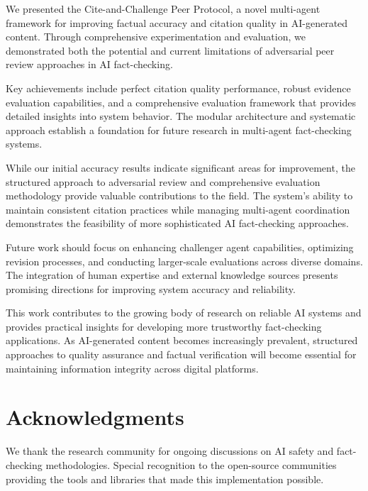 \documentclass{article}
\begin{document}
We presented the Cite-and-Challenge Peer Protocol, a novel multi-agent framework for improving factual accuracy and citation quality in AI-generated content. Through comprehensive experimentation and evaluation, we demonstrated both the potential and current limitations of adversarial peer review approaches in AI fact-checking.

Key achievements include perfect citation quality performance, robust evidence evaluation capabilities, and a comprehensive evaluation framework that provides detailed insights into system behavior. The modular architecture and systematic approach establish a foundation for future research in multi-agent fact-checking systems.

While our initial accuracy results indicate significant areas for improvement, the structured approach to adversarial review and comprehensive evaluation methodology provide valuable contributions to the field. The system's ability to maintain consistent citation practices while managing multi-agent coordination demonstrates the feasibility of more sophisticated AI fact-checking approaches.

Future work should focus on enhancing challenger agent capabilities, optimizing revision processes, and conducting larger-scale evaluations across diverse domains. The integration of human expertise and external knowledge sources presents promising directions for improving system accuracy and reliability.

This work contributes to the growing body of research on reliable AI systems and provides practical insights for developing more trustworthy fact-checking applications. As AI-generated content becomes increasingly prevalent, structured approaches to quality assurance and factual verification will become essential for maintaining information integrity across digital platforms.

\section*{Acknowledgments}

We thank the research community for ongoing discussions on AI safety and fact-checking methodologies. Special recognition to the open-source communities providing the tools and libraries that made this implementation possible.
\end{document}
